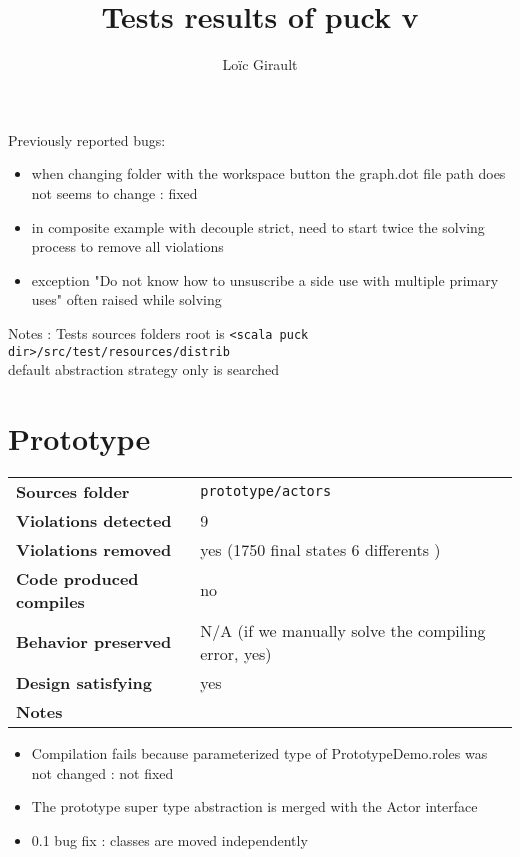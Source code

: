 \documentclass[french]{article}
\title{Tests results of puck v\puckVersion}
\author{Loïc Girault}
\begin{document}
\maketitle

Previously reported bugs: 
\begin{itemize}
\item when changing folder with the workspace button the graph.dot file path does not seems to change : fixed
\item in composite example with decouple strict, need to start twice the solving process to remove all violations
\item exception "Do not know how to unsuscribe a side use with multiple primary uses" often raised while solving
\end{itemize}

Notes :
Tests sources folders root  is \texttt{<scala puck dir>/src/test/resources/distrib}\\
default abstraction strategy only is searched

\section*{Prototype}
\noindent\begin{tabular}{ l p{12cm} }
\textbf{Sources folder} &  \texttt{prototype/actors}\\
\textbf{Violations detected} &  9\\
\textbf{Violations removed} & yes (1750 final states 6 differents )\\
\textbf{Code produced compiles} & no \\
\textbf{Behavior preserved} & N/A (if we manually solve the compiling error, yes)\\
\textbf{Design satisfying} & yes\\
\textbf{Notes} & \\
\end{tabular}
\begin{itemize}
\item Compilation fails because parameterized type of PrototypeDemo.roles was not changed : not fixed
\item The prototype super type abstraction is merged with the Actor interface
\item 0.1 bug fix : classes are moved independently
\end{itemize}
\end{document}
